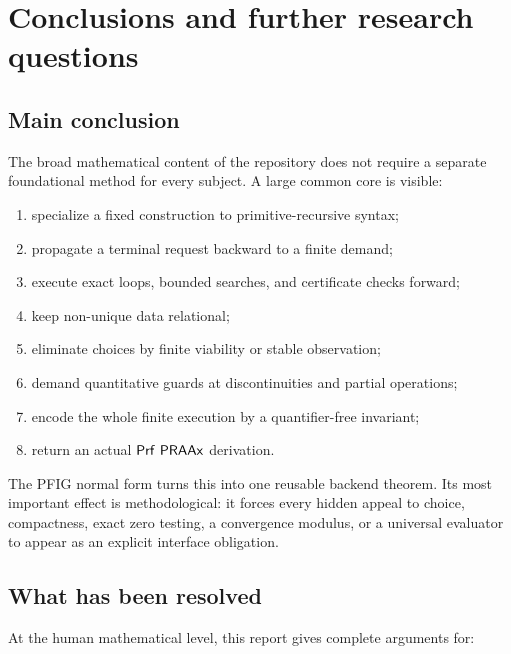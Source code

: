 \section{Conclusions and further research questions}
\label{sec:conclusion}

\subsection{Main conclusion}

The broad mathematical content of the repository does not require a separate foundational method for every subject.  A large common core is visible:

\begin{enumerate}
\item specialize a fixed construction to primitive-recursive syntax;
\item propagate a terminal request backward to a finite demand;
\item execute exact loops, bounded searches, and certificate checks forward;
\item keep non-unique data relational;
\item eliminate choices by finite viability or stable observation;
\item demand quantitative guards at discontinuities and partial operations;
\item encode the whole finite execution by a quantifier-free invariant;
\item return an actual \(\mathsf{Prf}\ \mathsf{PRAAx}\) derivation.
\end{enumerate}

The PFIG normal form turns this into one reusable backend theorem.  Its most important effect is methodological: it forces every hidden appeal to choice, compactness, exact zero testing, a convergence modulus, or a universal evaluator to appear as an explicit interface obligation.

\subsection{What has been resolved}

At the human mathematical level, this report gives complete arguments for:

